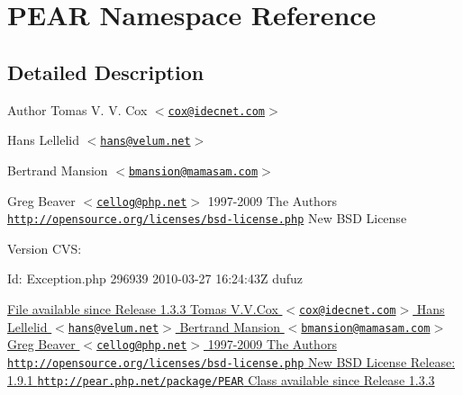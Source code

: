 \hypertarget{namespace_p_e_a_r}{
\section{PEAR Namespace Reference}
\label{namespace_p_e_a_r}
}


\subsection{Detailed Description}
\begin{DoxyAuthor}{Author}
Tomas V. V. Cox $<$\href{mailto:cox@idecnet.com}{\tt cox@idecnet.com}$>$ 

Hans Lellelid $<$\href{mailto:hans@velum.net}{\tt hans@velum.net}$>$ 

Bertrand Mansion $<$\href{mailto:bmansion@mamasam.com}{\tt bmansion@mamasam.com}$>$ 

Greg Beaver $<$\href{mailto:cellog@php.net}{\tt cellog@php.net}$>$  1997-\/2009 The Authors  \href{http://opensource.org/licenses/bsd-license.php}{\tt http://opensource.org/licenses/bsd-\/license.php} New BSD License 
\end{DoxyAuthor}
\begin{DoxyVersion}{Version}
CVS: 
\end{DoxyVersion}
\begin{DoxyParagraph}{Id:}
Exception.php 296939 2010-\/03-\/27 16:24:43Z dufuz 
\end{DoxyParagraph}
\hyperlink{}{File available since Release 1.3.3   Tomas V.V.Cox $<$\href{mailto:cox@idecnet.com}{\tt cox@idecnet.com}$>$  Hans Lellelid $<$\href{mailto:hans@velum.net}{\tt hans@velum.net}$>$  Bertrand Mansion $<$\href{mailto:bmansion@mamasam.com}{\tt bmansion@mamasam.com}$>$  Greg Beaver $<$\href{mailto:cellog@php.net}{\tt cellog@php.net}$>$  1997-\/2009 The Authors  \href{http://opensource.org/licenses/bsd-license.php}{\tt http://opensource.org/licenses/bsd-\/license.php} New BSD License  Release: 1.9.1  \href{http://pear.php.net/package/PEAR}{\tt http://pear.php.net/package/PEAR}  Class available since Release 1.3.3 }
